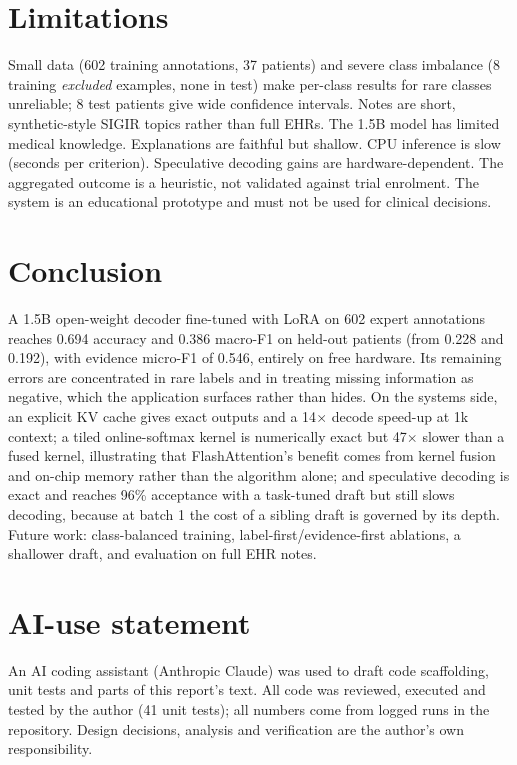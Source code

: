 \documentclass[conference]{IEEEtran}
\begin{document}
\section{Limitations}
Small data (602 training annotations, 37 patients) and severe class imbalance (8 training \emph{excluded} examples, none in test) make per-class results for rare classes unreliable; 8 test patients give wide confidence intervals. Notes are short, synthetic-style SIGIR topics rather than full EHRs. The 1.5B model has limited medical knowledge. Explanations are faithful but shallow. CPU inference is slow (seconds per criterion). Speculative decoding gains are hardware-dependent. The aggregated outcome is a heuristic, not validated against trial enrolment. The system is an educational prototype and must not be used for clinical decisions.

\section{Conclusion}
A 1.5B open-weight decoder fine-tuned with LoRA on 602 expert annotations reaches 0.694 accuracy and 0.386 macro-F1 on held-out patients (from 0.228 and 0.192), with evidence micro-F1 of 0.546, entirely on free hardware. Its remaining errors are concentrated in rare labels and in treating missing information as negative, which the application surfaces rather than hides. On the systems side, an explicit KV cache gives exact outputs and a 14$\times$ decode speed-up at 1k context; a tiled online-softmax kernel is numerically exact but 47$\times$ slower than a fused kernel, illustrating that FlashAttention's benefit comes from kernel fusion and on-chip memory rather than the algorithm alone; and speculative decoding is exact and reaches 96\% acceptance with a task-tuned draft but still slows decoding, because at batch 1 the cost of a sibling draft is governed by its depth. Future work: class-balanced training, label-first/evidence-first ablations, a shallower draft, and evaluation on full EHR notes.

\appendices
\section{AI-use statement}
An AI coding assistant (Anthropic Claude) was used to draft code scaffolding, unit tests and parts of this report's text. All code was reviewed, executed and tested by the author (41 unit tests); all numbers come from logged runs in the repository. Design decisions, analysis and verification are the author's own responsibility.
\end{document}
